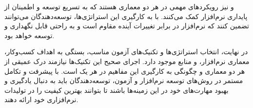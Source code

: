 و
نیز رویکردهای مهمی در هر دو معماری هستند که به تسریع توسعه و اطمینان از پایداری نرم‌افزار کمک می‌کنند. با به کارگیری این استراتژی‌ها، توسعه‌دهندگان می‌توانند تضمین کنند که نرم‌افزار در برابر تغییرات آینده مقاوم است و به راحتی قابل نگهداری و توسعه خواهد بود.

در نهایت، انتخاب استراتژی‌ها و تکنیک‌های آزمون مناسب، بستگی به اهداف کسب‌وکار، معماری نرم‌افزار، و منابع موجود دارد. اجرای صحیح این تکنیک‌ها نیازمند درک عمیقی از هر دو معماری و چگونگی به کارگیری این مفاهیم در هر یک است. با پیشرفت و تکامل مستمر در روش‌های توسعه نرم‌افزار و آزمون، توسعه‌دهندگان باید به دنبال یادگیری و بهبود مهارت‌های خود در این زمینه‌ها باشند تا بتوانند بهترین کیفیت را در تولیدات نرم‌افزاری خود ارائه دهند.